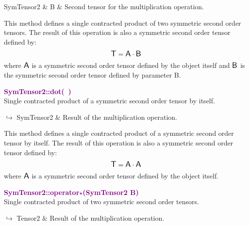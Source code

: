 \begin{tcolorbox}[width=\textwidth,myArgs,tabularx={ll|R}]
SymTensor2 & B & Second tensor for the multiplication operation.
\end{tcolorbox}

This method defines a single contracted product of two symmetric second order tensors.
The result of this operation is also a symmetric second order tensor defined by:
\begin{equation*}
\mbox{\large\ensuremath{\mathsf{T}}} = \mbox{\large\ensuremath{\mathsf{A}}} \cdot \mbox{\large\ensuremath{\mathsf{B}}}
\end{equation*}
where $\mbox{\large\ensuremath{\mathsf{A}}}$ is a symmetric second order tensor defined by the object itself and $\mbox{\large\ensuremath{\mathsf{B}}}$ is the symmetric second order tensor defined by parameter B.

\textcolor{purple}{\textbf{SymTensor2::dot(~)}}\label{SymTensor2::dot()}\\
Single contracted product of a symmetric second order tensor by itself.\vspace*{-0.5em}
\begin{tcolorbox}[grow to left by=-1cm, width=\textwidth-1cm,myArgs,tabularx={l|R}]
$\hookrightarrow$ SymTensor2 & Result of the multiplication operation.
\end{tcolorbox}

This method defines a single contracted product of a symmetric second order tensor by itself.
The result of this operation is also a symmetric second order tensor defined by:
\begin{equation*}
\mbox{\large\ensuremath{\mathsf{T}}} = \mbox{\large\ensuremath{\mathsf{A}}} \cdot \mbox{\large\ensuremath{\mathsf{A}}}
\end{equation*}
where $\mbox{\large\ensuremath{\mathsf{A}}}$ is a symmetric second order tensor defined by the object itself.

\textcolor{purple}{\textbf{SymTensor2::operator$\star$(SymTensor2 B)}}\label{SymTensor2::operator*(SymTensor2 B)}\\
Single contracted product of two symmetric second order tensors.\vspace*{-0.5em}
\begin{tcolorbox}[grow to left by=-1cm, width=\textwidth-1cm,myArgs,tabularx={l|R}]
$\hookrightarrow$ Tensor2 & Result of the multiplication operation.
\end{tcolorbox}


